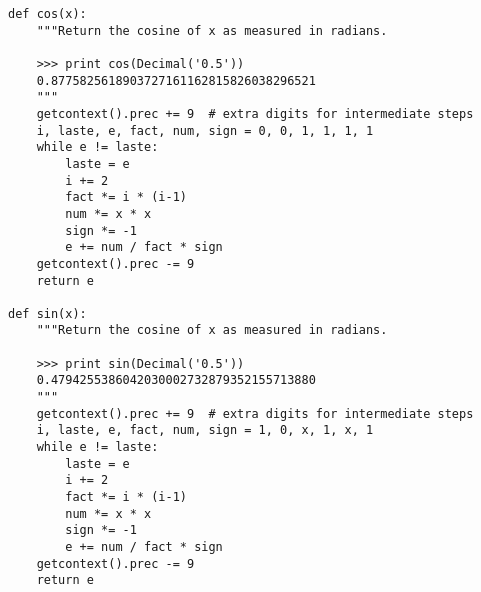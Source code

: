 \begin{verbatim}
def cos(x):
    """Return the cosine of x as measured in radians.

    >>> print cos(Decimal('0.5'))
    0.8775825618903727161162815826038296521
    """
    getcontext().prec += 9  # extra digits for intermediate steps
    i, laste, e, fact, num, sign = 0, 0, 1, 1, 1, 1
    while e != laste:
        laste = e    
        i += 2
        fact *= i * (i-1)
        num *= x * x
        sign *= -1
        e += num / fact * sign 
    getcontext().prec -= 9        
    return e    

def sin(x):
    """Return the cosine of x as measured in radians.

    >>> print sin(Decimal('0.5'))
    0.4794255386042030002732879352155713880
    """
    getcontext().prec += 9  # extra digits for intermediate steps
    i, laste, e, fact, num, sign = 1, 0, x, 1, x, 1
    while e != laste:
        laste = e    
        i += 2
        fact *= i * (i-1)
        num *= x * x
        sign *= -1
        e += num / fact * sign 
    getcontext().prec -= 9        
    return e

\end{verbatim}                                             
